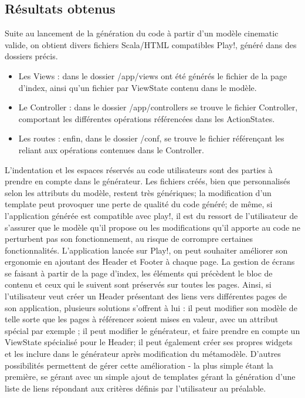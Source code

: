 \subsection{Résultats obtenus}
Suite au lancement de la génération du code à partir d'un modèle cinematic valide, on obtient divers fichiers Scala/HTML compatibles Play!, généré dans des dossiers précis.
\begin{itemize}
\item Les Views : dans le dossier /app/views ont été générés le fichier de la page d'index, ainsi qu'un fichier par ViewState contenu dans le modèle.
\item Le Controller : dans le dossier /app/controllers se trouve le fichier Controller, comportant les différentes opérations référencées dans les ActionStates.
\item Les routes : enfin, dans le dossier /conf, se trouve le fichier référençant les  reliant aux opérations contenues dans le Controller.
\end{itemize}
L'indentation et les espaces réservés au code utilisateurs sont des parties à prendre en compte dans le générateur. Les fichiers créés, bien que personnalisés selon les attributs du modèle, restent très génériques; la modification d'un template peut provoquer une perte de qualité du code généré; de même, si l'application générée est compatible avec play!, il est du ressort de l'utilisateur de s'assurer que le modèle qu'il propose ou les modifications qu'il apporte au code ne perturbent pas son fonctionnement, au risque de corrompre certaines fonctionnalités.
\newline
L'application lancée sur Play!, on peut souhaiter améliorer son ergonomie en ajoutant des Header et Footer à chaque page. La gestion de écrans se faisant à partir de la page d'index, les éléments qui précèdent le bloc de contenu et ceux qui le suivent sont préservés sur toutes les pages. Ainsi, si l'utilisateur veut créer un Header présentant des liens vers différentes pages de son application, plusieurs solutions s'offrent à lui : il peut modifier son modèle de telle sorte que les pages à référencer soient mises en valeur, avec un attribut spécial par exemple ; il peut modifier le générateur, et faire prendre en compte un ViewState spécialisé pour le Header; il peut également créer ses propres widgets et les inclure dans le générateur après modification du métamodèle. D'autres possibilités permettent de gérer cette amélioration - la plus simple étant la première, se gérant avec un simple ajout de templates gérant la génération d'une liste de liens répondant aux critères définis par l'utilisateur au préalable.